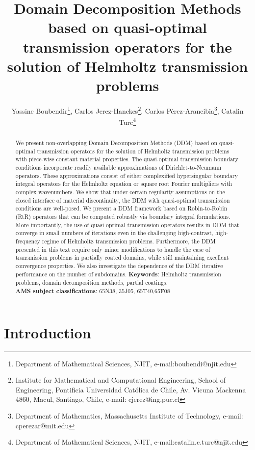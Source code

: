 \documentclass[11pt]{article}
\title{Domain Decomposition Methods based on quasi-optimal transmission operators for the solution of Helmholtz transmission problems}
\author{ Yassine Boubendir\thanks{Department of Mathematical Sciences, NJIT, e-mail:boubendi@njit.edu}, Carlos Jerez-Hanckes\thanks{Institute for Mathematical and Computational Engineering, School of Engineering, Pontificia Universidad Cat\'olica de Chile, Av. Vicuna Mackenna 4860, Macul, Santiago, Chile, e-mail: cjerez@ing.puc.cl}, Carlos P\'erez-Arancibia\thanks{Department of Mathematics, Massachusetts Institute of Technology, e-mail: cperezar@mit.edu}, Catalin Turc\thanks{Department of Mathematical Sciences, NJIT, e-mail:catalin.c.turc@njit.edu} }
\date{}
\numberwithin{equation}{section}
\begin{document}
\maketitle
\begin{abstract}
  We present non-overlapping Domain Decomposition Methods (DDM) based on quasi-optimal transmission operators for the solution of Helmholtz transmission problems with piece-wise constant material properties. The quasi-optimal transmission boundary conditions incorporate readily available approximations of Dirichlet-to-Neumann operators. These approximations consist of either complexified hypersingular boundary integral operators for the Helmholtz equation or square root Fourier multipliers with complex wavenumbers. We show that under certain regularity assumptions on the closed interface of material discontinuity, the DDM with quasi-optimal transmission conditions are well-posed. We present a DDM framework based on Robin-to-Robin (RtR) operators that can be computed robustly via boundary integral formulations. More importantly, the use of quasi-optimal transmission operators results in DDM that converge in small numbers of iterations even in the challenging high-contrast, high-frequency regime of Helmholtz transmission problems. Furthermore, the DDM presented in this text require only minor modifications to handle the case of transmission problems in partially coated domains, while still maintaining excellent convergence properties. We also investigate the dependence of the DDM iterative performance on the number of subdomains. 
 \newline \indent
  \textbf{Keywords}: Helmholtz transmission problems, domain decomposition methods, partial coatings.\\
   
 \textbf{AMS subject classifications}: 
 65N38, 35J05, 65T40,65F08
\end{abstract}



\section{Introduction}
\label{intro}
\end{document}

